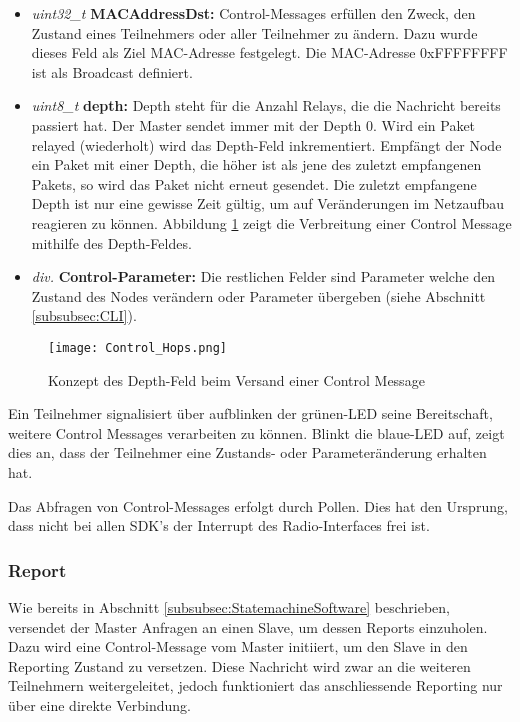 \begin{itemize}
	\item \textit{uint32\_t} \textbf{MACAddressDst:} Control-Messages erfüllen den Zweck, den Zustand eines Teilnehmers oder aller Teilnehmer zu ändern.
Dazu wurde dieses Feld als Ziel MAC-Adresse festgelegt. Die MAC-Adresse 0xFFFFFFFF ist als Broadcast definiert.
	
	\item \textit{uint8\_t} \textbf{depth:} Depth steht für die Anzahl Relays, die die Nachricht bereits passiert hat.
	Der Master sendet immer mit der Depth 0.
	Wird ein Paket relayed (wiederholt) wird das Depth-Feld inkrementiert.
	Empfängt der Node ein Paket mit einer Depth, die höher ist als jene des zuletzt empfangenen Pakets, so wird das Paket nicht erneut gesendet.
	Die zuletzt empfangene Depth ist nur eine gewisse Zeit gültig, um auf Veränderungen im Netzaufbau reagieren zu können.
	Abbildung \ref{fig:ControlMessagesHops} zeigt die Verbreitung einer Control Message mithilfe des Depth-Feldes.
	
	\item \textit{div.} \textbf{Control-Parameter:} Die restlichen Felder sind Parameter welche den Zustand des Nodes verändern oder Parameter übergeben (siehe Abschnitt \ref{subsubsec:CLI}).
\end{itemize}

\begin{figure}[H]
\centering
\texttt{[image: Control\_Hops.png]}
\caption{Konzept des Depth-Feld beim Versand einer Control Message}\label{fig:ControlMessagesHops}
\end{figure}

Ein Teilnehmer signalisiert über aufblinken der grünen-LED seine Bereitschaft, weitere Control Messages verarbeiten zu können. Blinkt die blaue-LED auf, zeigt dies an, dass der Teilnehmer eine Zustands- oder Parameteränderung erhalten hat. 

Das Abfragen von Control-Messages erfolgt durch Pollen.
Dies hat den Ursprung, dass nicht bei allen SDK's der Interrupt des Radio-Interfaces frei ist.


\subsubsection{Report}\label{subsubsec:Report}

Wie bereits in Abschnitt \ref{subsubsec:StatemachineSoftware} beschrieben, versendet der Master Anfragen an einen Slave, um dessen Reports einzuholen.
Dazu wird eine Control-Message vom Master initiiert, um den Slave in den Reporting Zustand zu versetzen.
Diese Nachricht wird zwar an die weiteren Teilnehmern weitergeleitet, jedoch funktioniert das anschliessende Reporting nur über eine direkte Verbindung.

